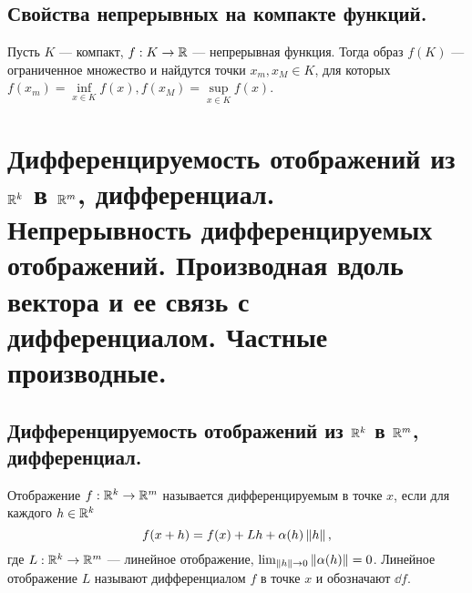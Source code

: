 \documentclass[a4paper]{article}
\theoremstyle{named}
\begin{document}
    \subsection{Свойства непрерывных на компакте функций.}

    \begin{consequence*}
        Пусть $K$ --- компакт, $f: K \to \mathbb{R}$ --- непрерывная функция. Тогда образ $f(K)$ --- ограниченное множество и найдутся точки $x_m, x_M \in K$, для которых $f(x_m) = \inf\limits_{x \in K} f(x), f(x_M) = \sup\limits_{x \in K} f(x)$.
    \end{consequence*}

    \section{Дифференцируемость отображений из $\mathbb{R}^k$ в $\mathbb{R}^m$, дифференциал. Непрерывность дифференцируемых отображений. Производная вдоль вектора и ее связь с дифференциалом. Частные производные.}

    \subsection{Дифференцируемость отображений из $\mathbb{R}^k$ в $\mathbb{R}^m$, дифференциал.}

    \begin{definition*}
        Отображение $f: \mathbb{R}^k \to \mathbb{R}^m$ называется дифференцируемым в точке $x$, если для каждого $h \in \mathbb{R}^k$
        \begin{equation*}
            f(x + h) = f(x) + Lh + \alpha(h) \left\lVert h\right\rVert,
        \end{equation*}
        где $L: \mathbb{R}^k \to \mathbb{R}^m$ --- линейное отображение, $\lim_{\left\lVert h\right\rVert \to 0} \left\lVert\alpha(h)\right\rVert = 0$. Линейное отображение $L$ называют дифференциалом $f$ в точке $x$ и обозначают $\dd f$.
    \end{definition*}
\end{document}
